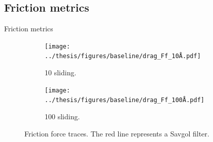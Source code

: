 \documentclass[
	10pt, %
]{beamer}
\begin{document}
\subsection{Friction metrics}
\begin{frame}{Friction metrics}
	\begin{figure}[H]
	\centering
	\begin{subfigure}[t]{0.49\textwidth}
		\centering
		\texttt{[image: ../thesis/figures/baseline/drag\_Ff\_10Å.pdf]}
		\caption{\SI{10}{} sliding.}
	\end{subfigure}
	\hfill
	\begin{subfigure}[t]{0.49\textwidth}
		\centering
		\texttt{[image: ../thesis/figures/baseline/drag\_Ff\_100Å.pdf]}
		\caption{\SI{100}{} sliding.}
	  \end{subfigure}
	   \caption{Friction force traces. The red line represents a Savgol filter.}
  \end{figure}
\end{frame}
\end{document}
